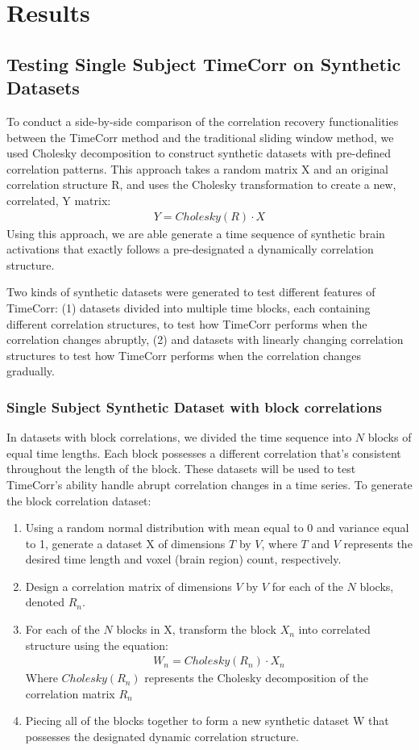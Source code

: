 \documentclass[11pt]{article}
\begin{document}
\newpage
\section{Results}
\subsection{Testing Single Subject TimeCorr on Synthetic Datasets}
To conduct a side-by-side comparison of the correlation recovery functionalities between the TimeCorr method and the traditional sliding window method, we used Cholesky decomposition to construct synthetic datasets with pre-defined correlation patterns. This approach takes a random matrix X and an original correlation structure R, and uses the Cholesky transformation to create a new, correlated, Y matrix:
\begin{align*}
Y = Cholesky(R) \cdot X
\end{align*}
Using this approach, we are able generate a time sequence of synthetic brain activations that exactly follows a pre-designated a dynamically correlation structure.

Two kinds of synthetic datasets were generated to test different features of TimeCorr: (1) datasets divided into multiple time blocks, each containing different correlation structures, to test how TimeCorr performs when the correlation changes abruptly, (2) and datasets with linearly changing correlation structures to test how TimeCorr performs when the correlation changes gradually.

\subsubsection{Single Subject Synthetic Dataset with block correlations}

In datasets with block correlations, we divided the time sequence into $N$ blocks of equal time lengths. Each block possesses a different correlation that's consistent throughout the length of the block. These datasets will be used to test TimeCorr's ability handle abrupt correlation changes in a time series. To generate the block correlation dataset:
\begin{enumerate}
\item Using a random normal distribution with mean equal to 0 and variance equal to 1, generate a dataset X of dimensions $T$ by $V$, where $T$ and $V$ represents the desired time length and voxel (brain region) count, respectively.
\item Design a correlation matrix of dimensions $V$ by $V$ for each of the $N$ blocks, denoted $R_n$.
\item For each of the $N$ blocks in X, transform the block $X_n$ into correlated structure using the equation:
\begin{align*}
W_n = Cholesky(R_n) \cdot X_n
\end{align*}
Where $Cholesky(R_n)$ represents the Cholesky decomposition of the correlation matrix $R_n$
\item Piecing all of the blocks together to form a new synthetic dataset W that possesses the designated dynamic correlation structure.
\end{enumerate}
\end{document}
